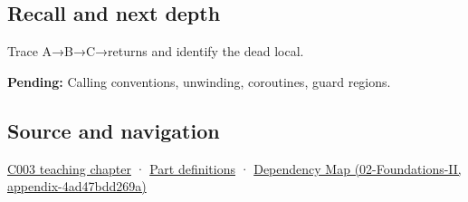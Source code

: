\subsection{Recall and next depth}\label{appendix-b081b7abe193-recall-and-next-depth}

Trace A→B→C→returns and identify the dead local.

\textbf{Pending:} Calling conventions, unwinding, coroutines, guard regions.

\subsection{Source and navigation}\label{appendix-b081b7abe193-source-and-navigation}

\hyperref[01-foundations-i-ch002-where-the-bytes-live]{C003 teaching chapter} · \hyperref[appendix-fd090d982a15-m003---parts-41-60]{Part definitions} · \href{../02-Foundations-II/main.pdf\#nameddest=appendix-4ad47bdd269a}{Dependency Map (02-Foundations-II, appendix-4ad47bdd269a)}
